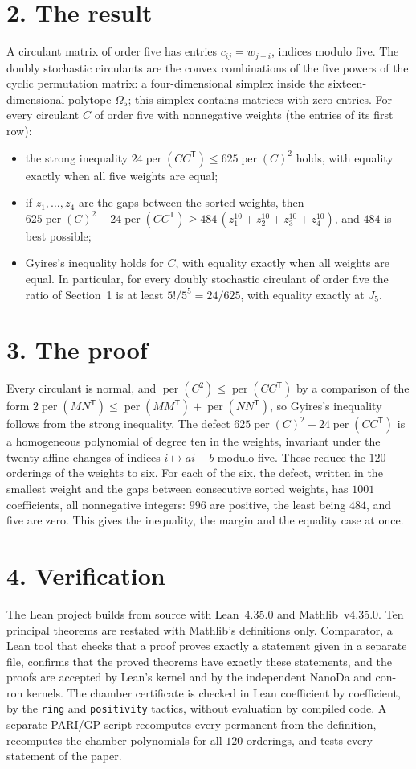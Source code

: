 \documentclass[11pt,a4paper]{article}
\newcommand{\per}{\operatorname{per}}
\newcommand{\T}{\mathsf{T}}
\begin{document}
\section*{2. The result}
A circulant matrix of order five has entries $c_{ij}=w_{j-i}$, indices modulo five. The doubly stochastic circulants are
the convex combinations of the five powers of the cyclic permutation matrix: a four-dimensional simplex inside the
sixteen-dimensional polytope $\Omega_5$; this simplex contains matrices with zero entries. For every circulant $C$ of
order five with nonnegative weights (the entries of its first row):
\begin{itemize}
\item the strong inequality $24\per(CC^\T)\le625\per(C)^2$ holds, with equality exactly when all five weights are
equal;
\item if $z_1,\dots,z_4$ are the gaps between the sorted weights, then
$625\per(C)^2-24\per(CC^\T)\ge484\,(z_1^{10}+z_2^{10}+z_3^{10}+z_4^{10})$, and $484$ is best possible;
\item Gyires's inequality holds for $C$, with equality exactly when all weights are equal. In particular, for every doubly
stochastic circulant of order five the ratio of Section~1 is at least $5!/5^5=24/625$, with equality exactly at
$J_5$.
\end{itemize}

\section*{3. The proof}
Every circulant is normal, and $\per(C^2)\le\per(CC^\T)$ by a comparison of the form
$2\per(MN^\T)\le\per(MM^\T)+\per(NN^\T)$, so Gyires's inequality follows from the strong inequality. The defect
$625\per(C)^2-24\per(CC^\T)$ is a homogeneous polynomial of degree ten in the weights, invariant under the twenty affine
changes of indices $i\mapsto ai+b$ modulo five. These reduce the $120$ orderings of the weights to six. For each of the six,
the defect, written in the smallest weight and the gaps between consecutive sorted weights, has $1001$ coefficients,
all nonnegative integers: $996$ are positive, the least being $484$, and five are zero. This gives the
inequality, the margin and the equality case at once.

\section*{4. Verification}
The Lean project builds from source with Lean~4.35.0 and Mathlib~v4.35.0. Ten principal theorems are restated with
Mathlib's definitions only. Comparator, a Lean tool that checks that a proof proves exactly a statement given in a
separate file, confirms that the proved theorems have exactly these statements, and the proofs are accepted by Lean's
kernel and by the independent NanoDa and con-ron kernels. The chamber certificate is checked in
Lean coefficient by coefficient, by the \texttt{ring} and \texttt{positivity} tactics, without evaluation by compiled
code. A separate PARI/GP script recomputes every permanent from the definition, recomputes the chamber polynomials for
all $120$ orderings, and tests every statement of the paper.
\end{document}
